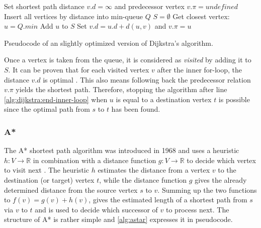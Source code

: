			\begin{algorithm}[h]
				\begin{algorithmic}[1]
						\State Set shortest path distance $v.d = \infty$ and predecessor vertex $v.\pi = undefined$
					\EndFor
					\State Insert all vertices by distance into min-queue $Q$
					\State $S = \emptyset$
						\State Get closest vertex: $u = Q.min$
							\State Add $u$ to $S$
								\State Set $v.d = u.d + d(u, v)$ and $v.\pi = u$
							\EndIf
						\EndFor \label{alg:dijkstra:end-inner-loop}
					\EndWhile
				\end{algorithmic}
				\caption{Pseudocode of an slightly optimized version of Dijkstra's algorithm.}
				\label{alg:dijkstra}
			\end{algorithm}
			\noindent
			Once a vertex is taken from the queue, it is considered as \emph{visited} by adding it to $S$.
			It can be proven that for each visited vertex $v$ after the inner for-loop, the distance $v.d$ is optimal \cite[659-661]{cormen-introduction-to-alg}.
			This also means following back the predecessor relation $v.\pi$ yields the shortest path.
			Therefore, stopping the algorithm after line \ref{alg:dijkstra:end-inner-loop} when $u$ is equal to a destination vertex $t$ is possible since the optimal path from $s$ to $t$ has been found.
		
		\subsubsection{A*}
		\label{subsubsec:astar}
		
			The A* shortest path algorithm was introduced in 1968 and uses a heuristic $h : V \rightarrow \mathbb{R}$ in combination with a distance function $g : V \rightarrow \mathbb{R}$ to decide which vertex to visit next \cite{astar}.
			The heuristic $h$ estimates the distance from a vertex $v$ to the destination (or target) vertex $t$, while the distance function $g$ gives the already determined distance from the source vertex $s$ to $v$.
			Summing up the two functions to $f(v) = g(v) + h(v)$, gives the estimated length of a shortest path from $s$ via $v$ to $t$ and is used to decide which successor of $v$ to process next.
			The structure of A* is rather simple and \cref{alg:astar} expresses it in pseudocode.
			

